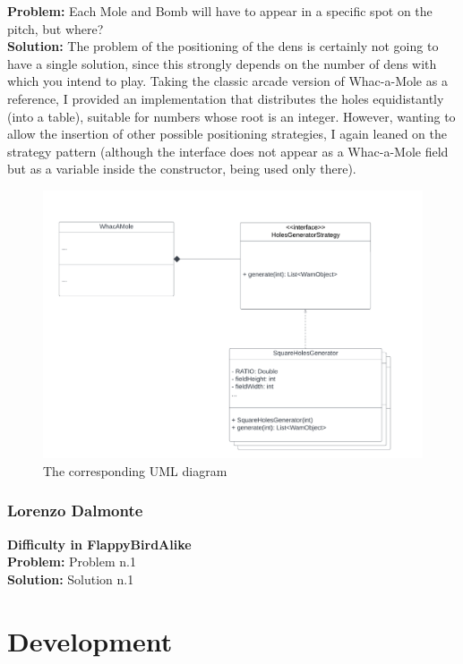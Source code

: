 \documentclass[a4paper,12pt]{report}
\begin{document}
\textbf{Problem:} Each Mole and Bomb will have to appear in a specific spot on the
pitch, but where?  \\
\textbf{Solution:} The problem of the positioning of the dens is certainly not going to have a single solution, since this strongly depends
on the number of dens with which you intend to play. Taking the classic arcade version of Whac-a-Mole as a reference, I provided an
implementation that distributes the holes equidistantly (into a table), suitable for numbers whose root is an integer. However, wanting to
allow the insertion of other possible positioning strategies, I again leaned on the strategy pattern (although the interface does not appear
as a Whac-a-Mole field but as a variable inside the constructor, being used only there).
\begin{figure}[ht]
	\centering
	\includegraphics[width=\textwidth]{res/HolesGenerator.pdf}
	\caption{The corresponding UML diagram}
\end{figure}
\pagebreak

\subsection*{Lorenzo Dalmonte}
\textbf{Difficulty in FlappyBirdAlike}\\
\textbf{Problem:} Problem n.1\\
\textbf{Solution:} Solution n.1

\chapter{Development}
\end{document}
